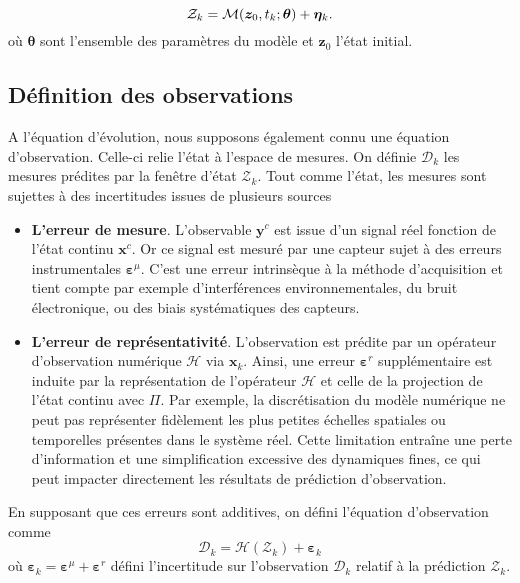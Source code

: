 \begin{equation*}
    \mathcal Z_k = \mathcal{M}(\bm z_0, t_k ; \bm \theta) + \bm \eta_k.
\end{equation*}
où $\bm \theta$ sont l'ensemble des paramètres du modèle et $\bm z_0$ l'état initial.

\subsection{Définition des observations}
A l'équation d'évolution, nous supposons également connu une équation d'observation. Celle-ci relie l'état à l'espace de mesures. On définie $\mathcal{D}_k$ les mesures prédites par la fenêtre d'état $\mathcal{Z}_k$. Tout comme l'état, les mesures sont sujettes à des incertitudes issues de plusieurs sources

\begin{itemize}
    \item \textbf{L'erreur de mesure}. L'observable $\bm y^c$ est issue d'un signal réel fonction de l'état continu $\bm x^c$. Or ce signal est mesuré par une capteur sujet à des erreurs instrumentales $\bm \varepsilon^{\mu}$. C'est une erreur intrinsèque à la méthode d'acquisition et tient compte par exemple d'interférences environnementales, du bruit électronique, ou des biais systématiques des capteurs.
    \item \textbf{L'erreur de représentativité}. L'observation est prédite par un opérateur d'observation numérique $\mathcal H$ via $\bm x_k$. Ainsi, une erreur $\bm{\varepsilon}^r$ supplémentaire est induite par la représentation de l'opérateur $\mathcal H$ et celle de la projection de l'état continu avec $\Pi$. Par exemple, la discrétisation du modèle numérique ne peut pas représenter fidèlement les plus petites échelles spatiales ou temporelles présentes dans le système réel. Cette limitation entraîne une perte d'information et une simplification excessive des dynamiques fines, ce qui peut impacter directement les résultats de prédiction d'observation.
\end{itemize}

En supposant que ces erreurs sont additives, on défini l'équation d'observation comme
\begin{equation*}
    \mathcal D_k = \mathcal H (\mathcal{Z}_k) + \bm{\varepsilon}_k
\end{equation*} où $\bm{\varepsilon}_k = \bm{\varepsilon}^\mu  + \bm{\varepsilon}^r$ défini l'incertitude sur l'observation $\mathcal D_k$ relatif à la prédiction $\mathcal{Z}_k$.

